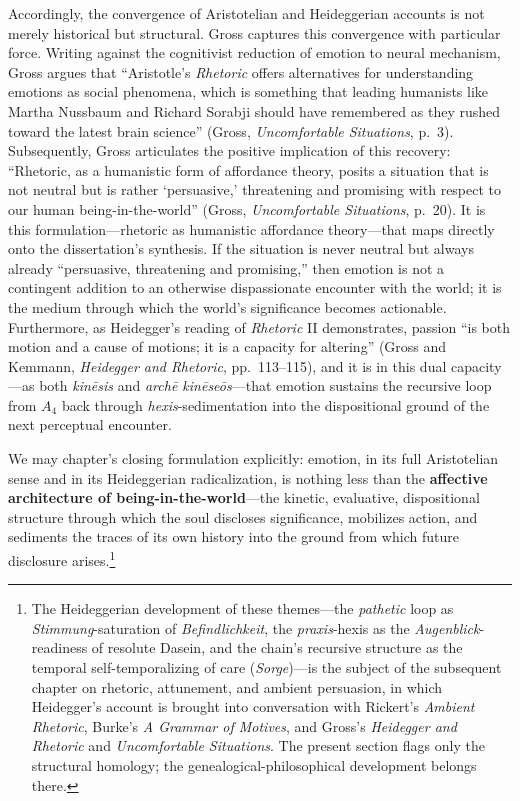 \documentclass{article}
\begin{document}
Accordingly, the convergence of Aristotelian and Heideggerian accounts is not merely historical but structural. Gross captures this convergence with particular force. Writing against the cognitivist reduction of emotion to neural mechanism, Gross argues that ``Aristotle's \textit{Rhetoric} offers alternatives for understanding emotions as social phenomena, which is something that leading humanists like Martha Nussbaum and Richard Sorabji should have remembered as they rushed toward the latest brain science'' (Gross, \textit{Uncomfortable Situations}, p.~3). Subsequently, Gross articulates the positive implication of this recovery: ``Rhetoric, as a humanistic form of affordance theory, posits a situation that is not neutral but is rather `persuasive,' threatening and promising with respect to our human being-in-the-world'' (Gross, \textit{Uncomfortable Situations}, p.~20). It is this formulation---rhetoric as humanistic affordance theory---that maps directly onto the dissertation's synthesis. If the situation is never neutral but always already ``persuasive, threatening and promising,'' then emotion is not a contingent addition to an otherwise dispassionate encounter with the world; it is the medium through which the world's significance becomes actionable. Furthermore, as Heidegger's reading of \textit{Rhetoric} II demonstrates, passion ``is both motion and a cause of motions; it is a capacity for altering'' (Gross and Kemmann, \textit{Heidegger and Rhetoric}, pp.~113--115), and it is in this dual capacity---as both \textit{kinēsis} and \textit{archē kinēseōs}---that emotion sustains the recursive loop from $A_4$ back through \textit{hexis}-sedimentation into the dispositional ground of the next perceptual encounter.

We may chapter's closing formulation explicitly: emotion, in its full Aristotelian sense and in its Heideggerian radicalization, is nothing less than the \textbf{affective architecture of being-in-the-world}---the kinetic, evaluative, dispositional structure through which the soul discloses significance, mobilizes action, and sediments the traces of its own history into the ground from which future disclosure arises.\footnote{The Heideggerian development of these themes---the \textit{pathetic} loop as \textit{Stimmung}-saturation of \textit{Befindlichkeit}, the \textit{praxis}-hexis as the \textit{Augenblick}-readiness of resolute Dasein, and the chain's recursive structure as the temporal self-temporalizing of care (\textit{Sorge})---is the subject of the subsequent chapter on rhetoric, attunement, and ambient persuasion, in which Heidegger's account is brought into conversation with Rickert's \textit{Ambient Rhetoric}, Burke's \textit{A Grammar of Motives}, and Gross's \textit{Heidegger and Rhetoric} and \textit{Uncomfortable Situations}. The present section flags only the structural homology; the genealogical-philosophical development belongs there.}
\end{document}
